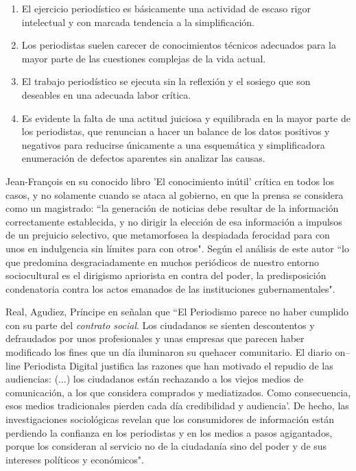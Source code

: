 \begin{enumerate}
\item El ejercicio periodístico es básicamente una actividad de escaso rigor intelectual y con marcada tendencia a la simplificación. 
\item Los periodistas suelen carecer de conocimientos técnicos adecuados para la mayor parte de las cuestiones complejas de la vida actual.
\item El trabajo periodístico se ejecuta sin la reflexión y el sosiego que son deseables en una adecuada labor crítica. 
\item Es evidente la falta de una actitud juiciosa y equilibrada en la mayor parte de los periodistas, que renuncian a hacer un
balance de los datos positivos y negativos para reducirse únicamente a una esquemática y simplificadora enumeración de defectos aparentes sin analizar las causas.
\end{enumerate}

Jean-François en su conocido libro 'El conocimiento inútil' \cite{revel1990conocimiento} crítica en todos los casos, y no solamente cuando se ataca al gobierno, en que la prensa se considera como un magistrado: ``la generación de noticias debe resultar de la información correctamente establecida, y no dirigir la elección de esa información a impulsos de un prejuicio selectivo, que metamorfosea la despiadada ferocidad para con unos en indulgencia sin límites para con otros". Según el análisis de este autor ``lo que predomina desgraciadamente en muchos periódicos de nuestro entorno sociocultural es el dirigismo apriorista en contra del poder, la predisposición condenatoria contra los actos emanados de las instituciones gubernamentales".

Real, Agudiez, Príncipe en \cite{ESMPESMP0707110189A} señalan que ``El Periodismo parece no haber cumplido con su parte del \emph{contrato social}. Los ciudadanos se sienten descontentos y defraudados por unos profesionales y unas empresas que parecen haber modificado los fines que un día iluminaron su quehacer comunitario. El diario on–line Periodista Digital justifica las razones que han motivado el repudio de las audiencias: (...) los ciudadanos están rechazando a los viejos medios de comunicación, a los que considera comprados y mediatizados. Como consecuencia, esos medios tradicionales pierden cada día credibilidad y audiencia'. De hecho, las investigaciones sociológicas revelan que los consumidores de información están perdiendo la confianza en los periodistas y en los medios a pasos agigantados, porque los consideran al servicio no de la ciudadanía sino del poder y de sus intereses políticos y económicos".

